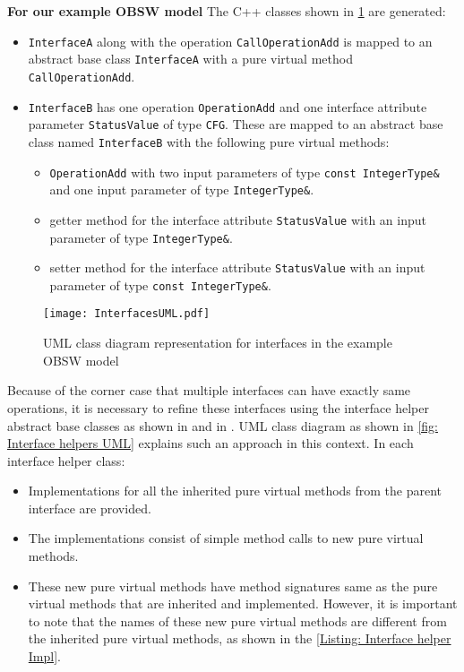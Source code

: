 \textbf{For our example OBSW model} The C++ classes shown in \cref{fig: InterfacesUML} are generated:
\begin{itemize}
\item \texttt{InterfaceA} along with the operation \texttt{CallOperationAdd} is mapped to an abstract base class \texttt{InterfaceA} with a pure virtual method \texttt{CallOperationAdd}. 
\item \texttt{InterfaceB} has one operation \texttt{OperationAdd} and one interface attribute parameter \texttt{StatusValue} of type \texttt{CFG}. These are mapped to an abstract base class named \texttt{InterfaceB} with the following pure virtual methods:
\begin{itemize}
\item \texttt{OperationAdd} with two input parameters of type \texttt{const\allowbreak \ IntegerType\&} and one input parameter of type \texttt{IntegerType\&}.
\item getter method for the interface attribute \texttt{StatusValue} with an input parameter of type \texttt{IntegerType\&}.
\item setter method for the interface attribute \texttt{StatusValue} with an input parameter of type \texttt{const\allowbreak \ IntegerType\&}.
\end{itemize} 
\end{itemize}

\begin{figure}[h]
	\centering
	\texttt{[image: InterfacesUML.pdf]}
	\caption{UML class diagram representation for interfaces in the example OBSW model}
	\label{fig: InterfacesUML}
\end{figure}

Because of the corner case that multiple interfaces can have exactly same operations, it is necessary to refine these interfaces using the interface helper abstract base classes as shown in \cite{MultipleInheritance} and in \cite{C++Book}. UML class diagram as shown in \cref{fig: Interface helpers UML} explains such an approach in this context. In each interface helper class:
\begin{itemize}
\item Implementations for all the inherited pure virtual methods from the parent interface are provided.
\item The implementations consist of simple method calls to new pure virtual methods.
\item These new pure virtual methods have method signatures same as the pure virtual methods that are inherited and implemented. However, it is important to note that the names of these new pure virtual methods are different from the inherited pure virtual methods, as shown in the \cref{Listing: Interface helper Impl}.
\end{itemize}

